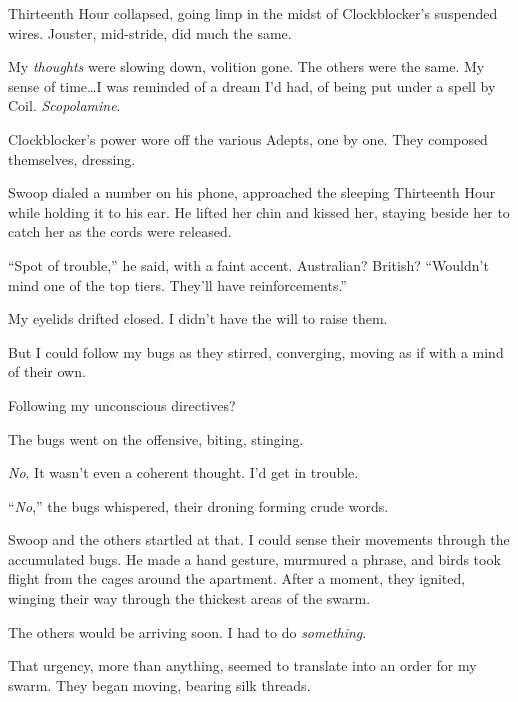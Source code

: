 Thirteenth Hour collapsed, going limp in the midst of Clockblocker's suspended wires.  Jouster, mid-stride, did much the same.



My \emph{thoughts} were slowing down, volition gone.  The others were the same.  My sense of time\ldots  I was reminded of a dream I'd had, of being put under a spell by Coil.  \emph{Scopolamine}.



Clockblocker's power wore off the various Adepts, one by one.  They composed themselves, dressing.



Swoop dialed a number on his phone, approached the sleeping Thirteenth Hour while holding it to his ear.  He lifted her chin and kissed her, staying beside her to catch her as the cords were released.



``Spot of trouble,'' he said, with a faint accent.  Australian?  British?  ``Wouldn't mind one of the top tiers.  They'll have reinforcements.''



My eyelids drifted closed.  I didn't have the will to raise them.



But I could follow my bugs as they stirred, converging, moving as if with a mind of their own.



Following my unconscious directives?



The bugs went on the offensive, biting, stinging.



\emph{No}.  It wasn't even a coherent thought.  I'd get in trouble.



``\emph{No},'' the bugs whispered, their droning forming crude words.



Swoop and the others startled at that.  I could sense their movements through the accumulated bugs.  He made a hand gesture, murmured a phrase, and birds took flight from the cages around the apartment.  After a moment, they ignited, winging their way through the thickest areas of the swarm.



The others would be arriving soon.  I had to do \emph{something}.



That urgency, more than anything, seemed to translate into an order for my swarm.  They began moving, bearing silk threads.



